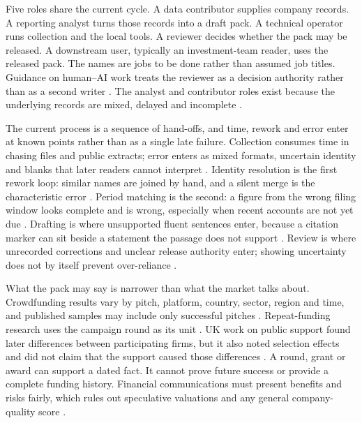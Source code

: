 Five roles share the current cycle. A data contributor supplies company records. A reporting
analyst turns those records into a draft pack. A technical operator runs collection and the local
tools. A reviewer decides whether the pack may be released. A downstream user, typically an
investment-team reader, uses the released pack. The names are jobs to be done rather than assumed
job titles. Guidance on human--AI work treats the reviewer as a decision authority rather than as
a second writer \citep{amershi2019guidelines,bucinca2021forcing}. The analyst and contributor
roles exist because the underlying records are mixed, delayed and incomplete
\citep{nikiforova2020quality,hardman2023small}.

The current process is a sequence of hand-offs, and time, rework and error enter at known points
rather than as a single late failure. Collection consumes time in chasing files and public
extracts; error enters as mixed formats, uncertain identity and blanks that later readers cannot
interpret \citep{nikiforova2020quality,krasikov2020ready}. Identity resolution is the first
rework loop: similar names are joined by hand, and a silent merge is the characteristic error
\citep{surak2026gateways,thorne2026funding}. Period matching is the second: a figure from the
wrong filing window looks complete and is wrong, especially when recent accounts are not yet due
\citep{hardman2023small,galanakis2026chrt}. Drafting is where unsupported fluent sentences enter,
because a citation marker can sit beside a statement the passage does not support
\citep{gao2023alce,gao2023rarr}. Review is where unrecorded corrections and unclear release
authority enter; showing uncertainty does not by itself prevent over-reliance
\citep{amershi2019guidelines,bucinca2021forcing}.

What the pack may say is narrower than what the market talks about. Crowdfunding results vary by
pitch, platform, country, sector, region and time, and published samples may include only
successful pitches \citep{estrin2024digital}. Repeat-funding research uses the campaign round as
its unit \citep{wasti2024successive}. UK work on public support found later differences between
participating firms, but it also noted selection effects and did not claim that the support caused
those differences \citep{mondal2025state,thorne2026funding}. A round, grant or award can support a
dated fact. It cannot prove future success or provide a complete funding history. Financial
communications must present benefits and risks fairly, which rules out speculative valuations and
any general company-quality score \citep{fca2024promotions,mondal2025state}.

